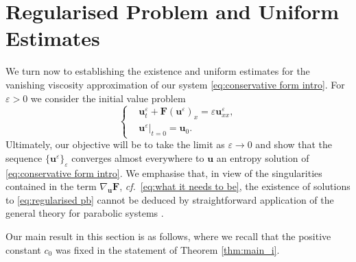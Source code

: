 \documentclass[11pt,a4paper,reqno]{amsart}
\numberwithin{equation}{section}
\theoremstyle{definition}
\theoremstyle{remark}
\newcommand{\bu}{\mathbf{u}}
\newcommand{\bF}{\mathbf{F}}
\begin{document}
{\section{Regularised Problem and Uniform Estimates}\label{sec:unif est}

We turn now to establishing the existence and uniform estimates for the vanishing viscosity approximation of our system \eqref{eq:conservative form intro}. For $\varepsilon>0$ we consider the initial value problem 
\begin{equation}\label{eq:regularised pb}
    \left\lbrace\begin{aligned}
        &\bu^\varepsilon_t + \bF(\bu^\varepsilon)_x = \varepsilon  \bu^\varepsilon_{xx}, \\ 
        &\bu^\varepsilon|_{t=0} = \bu_0. 
    \end{aligned}\right.
\end{equation}
Ultimately, our objective will be to take the limit as $\varepsilon \to 0$ and show that the sequence $\{\bu^\varepsilon\}_\varepsilon$ converges almost everywhere to $\bu$ an entropy solution of \eqref{eq:conservative form intro}. We emphasise that, in view of the singularities contained in the term $\nabla_{\bu}\bF$, \textit{cf.}~\eqref{eq:what it needs to be}, the existence of solutions to \eqref{eq:regularised pb} cannot be deduced by straightforward application of the general theory for parabolic systems \cite{ladyzhenskaia1988linear}. 

\smallskip 

Our main result in this section is as follows, where we recall that the positive constant $c_0$ was fixed in the statement of Theorem \ref{thm:main_i}.

}
\end{document}
